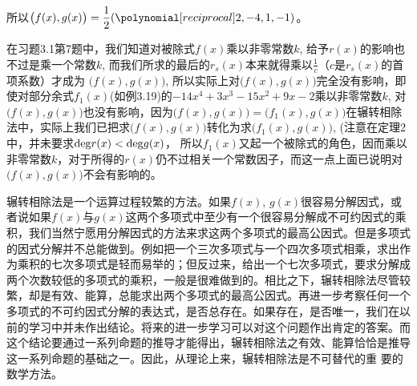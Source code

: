\begin{solution}
\begin{center}
\end{center}    

所以$\big(f(x),g(x)\big)=\frac{1}{2}(\poly{2,-4,1,-1})$。
\end{solution}

在习题3.1第7题中，我们知道对被除式$f(x)$乘以非零常数$k$, 给予$r(x)$的影响也不过是乘一个常数$k$, 而我们所求的最后的$r_s(x)$本来就得乘以$\frac{1}{c}$（$c$是$r_s(x)$的首项系数）才成为
$\big(f(x),g(x)\big)$, 所以实际上对$\big(f(x),g(x)\big)$完全没有影响，即使对部分余式$f_1(x)$(如例3.19)的$-14x^4+3x^3-15x^2+9x-2$乘以非零常数$k$, 对$\big(f(x),g(x)\big)$也没有影响，因为$\big(f(x),g(x)\big)=\big(f_1(x),g(x)\big)$在辗转相除法中，实际上我们已把求$\big(f(x),g(x)\big)$转化为求$\big(f_1(x),g(x)\big)$, (注意在定理2中，并未要求${\rm deg}r(x)<{\rm deg}g(x)$，
所以$f_1(x)$又起一个被除式的角色，因而乘以非零常数$k$，对于所得的$r(x)$仍不过相关一个常数因子，而这一点上面已说明对$\big(f(x),g(x)\big)$不会有影响的。

辗转相除法是一个运算过程较繁的方法。如果$f(x)$, $g(x)$很容易分解因式，或者说如果$f(x)$与$g(x)$这两个多项式中至少有一个很容易分解成不可约因式的乘积，我们当然宁愿用分解因式的方法来求这两个多项式的最高公因式。但是多项式的因式分解并不总能做到。例如把一个三次多项式与一个四次多项式相乘，求出作为乘积的七次多项式是轻而易举的；但反过来，给出一个七次多项式，要求分解成两个次数较低的多项式的乘积，一般是很难做到的。相比之下，辗转相除法尽管较繁，却是有效、能算，总能求出两个多项式的最高公因式。再进一步考察任何一个多项式的不可约因式分解的表达式，是否总存在。如果存在，是否唯一，我们在以前的学习中并未作出结论。将来的进一步学习可以对这个问题作出肯定的答案。而这个结论要通过一系列命题的推导才能得出，辗转相除法之有效、能算恰恰是推导这一系列命题的基础之一。因此，从理论上来，辗转相除法是不可替代的重
要的数学方法。

